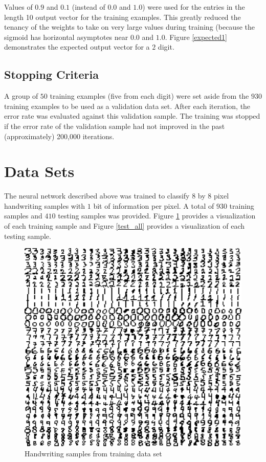 \documentclass{article}
\begin{document}
Values of \(0.9\) and \(0.1\) (instead of \(0.0\) and \(1.0\)) were used for the entries in the length 10 output vector for the training examples. This greatly reduced the tenancy of the weights to take on very large values during training (because the sigmoid has horizontal asymptotes near \(0.0\) and \(1.0\). Figure \ref{expected1} demonstrates the expected output vector for a \(2\) digit.

\subsection{Stopping Criteria}

A group of \(50\) training examples (five from each digit) were set aside from the \(930\) training examples to be used as a validation data set. After each iteration, the error rate was evaluated against this validation sample. The training was stopped if the error rate of the validation sample had not improved in the past (approximately) 200,000 iterations.

\section{Data Sets}\label{Dataset}

The neural network described above was trained to classify \(8\) by \(8\) pixel handwriting samples with \(1\) bit of information per pixel. A total of \(930\) training samples and \(410\) testing samples was provided. Figure \ref{train_all} provides a visualization of each training sample and Figure \ref{test_all} provides a visualization of each testing sample.

\begin{figure}
\centering
\includegraphics[width=1.00\textwidth]{data/visualization/all_training_data.png}
\caption{Handwriting samples from training data set}
\label{train_all}
\end{figure}
\end{document}
